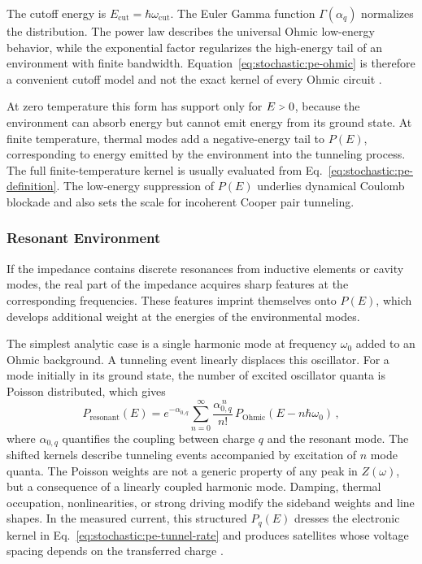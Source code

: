             The cutoff energy is $E_\mathrm{cut}=\hbar\omega_\mathrm{cut}$. The Euler Gamma function $\Gamma(\alpha_q)$ normalizes the distribution. The power law describes the universal Ohmic low-energy behavior, while the exponential factor regularizes the high-energy tail of an environment with finite bandwidth. Equation~\eqref{eq:stochastic:pe-ohmic} is therefore a convenient cutoff model and not the exact kernel of every Ohmic circuit \cite{ingold_charge_1992}.

            At zero temperature this form has support only for $E\sgt{}0$, because the environment can absorb energy but cannot emit energy from its ground state. At finite temperature, thermal modes add a negative-energy tail to $P(E)$, corresponding to energy emitted by the environment into the tunneling process. The full finite-temperature kernel is usually evaluated from Eq.~\eqref{eq:stochastic:pe-definition}. The low-energy suppression of $P(E)$ underlies dynamical Coulomb blockade and also sets the scale for incoherent Cooper pair tunneling.

        \subsubsection*{Resonant Environment}

            If the impedance contains discrete resonances from inductive elements or cavity modes, the real part of the impedance acquires sharp features at the corresponding frequencies. These features imprint themselves onto $P(E)$, which develops additional weight at the energies of the environmental modes.

            The simplest analytic case is a single harmonic mode at frequency $\omega_0$ added to an Ohmic background. A tunneling event linearly displaces this oscillator. For a mode initially in its ground state, the number of excited oscillator quanta is Poisson distributed, which gives
            \begin{equation}
                P_\mathrm{resonant}(E) = e^{-\alpha_{0,q}} \sum_{n=0}^{\infty} \frac{\alpha_{0,q}^{\,n}}{n!}\, P_\mathrm{Ohmic}(E - n\hbar\omega_0)\,,
            \end{equation}
            where $\alpha_{0,q}$ quantifies the coupling between charge $q$ and the resonant mode. The shifted kernels describe tunneling events accompanied by excitation of $n$ mode quanta. The Poisson weights are not a generic property of any peak in $Z(\omega)$, but a consequence of a linearly coupled harmonic mode. Damping, thermal occupation, nonlinearities, or strong driving modify the sideband weights and line shapes. In the measured current, this structured $P_q(E)$ dresses the electronic kernel in Eq.~\eqref{eq:stochastic:pe-tunnel-rate} and produces satellites whose voltage spacing depends on the transferred charge \cite{ingold_charge_1992}.

